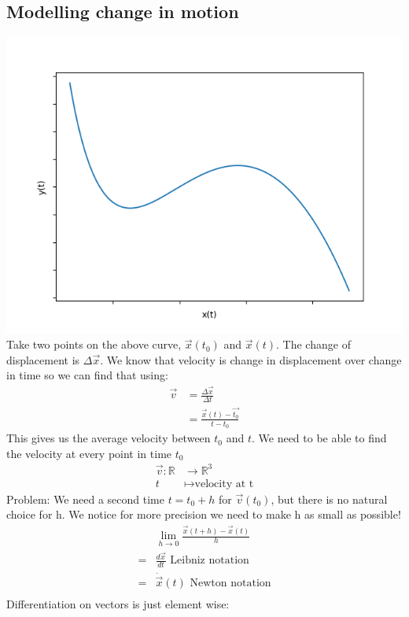 \documentclass[a4paper,12pt]{article}
\begin{document}
\subsection*{Modelling change in motion}
\includegraphics[scale=0.4]{example_curve} \\
Take two points on the above curve, $\vec{x}(t_0)$ and $\vec{x}(t)$.
The change of displacement is $\Delta \vec{x}$. We know that velocity is change in displacement over change in time so we can find that using:
\begin{align*}
\vec{v} & = \frac{\Delta \vec{x}}{\Delta t} \\
& = \frac{\vec{x}(t)-\vec{t_0}}{t-t_0}
\end{align*}
This gives us the average velocity between $t_0$ and $t$. We need to be able to find the velocity at every point in time $t_0$
\begin{align*}
\vec{v}: \mathbb{R} & \rightarrow \mathbb{R}^3 \\
t & \mapsto \text{velocity at t}
\end{align*}
Problem: We need a second time $t = t_0 + h$ for $\vec{v}(t_0)$, but there is no natural choice for h.
We notice for more precision we need to make h as small as possible!
\begin{align*}
&\lim_{h \to 0} \frac{\vec{x}(t+h)-\vec{x}(t)}{h} \\
= & \frac{d\vec{x}}{dt} \text{ Leibniz notation} \\
= & \dot{\vec{x}}(t) \text{ Newton notation}\\
\end{align*}
Differentiation on vectors is just element wise:
\end{document}
